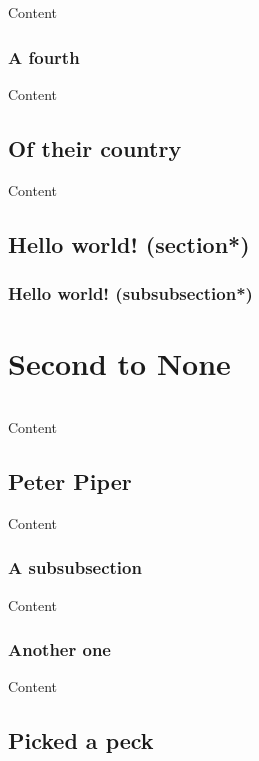 \documentclass{article}
\newcommand{\insMinitoctab}[2][]{%
    \begin{center}#2
    \begin{tabular}{c}\toprule
    \begin{minipage}[c]{0.8\linewidth}
    \insertminitoc[#1]
    \end{minipage}\\ \bottomrule
    \end{tabular}
    \end{center}
}
\begin{document}
Content

\subsubsection{A fourth}

Content

\subsection{Of their country}

Content


\subsection*{Hello world! (section*)}

\subsubsection*{Hello world! (subsubsection*)}


\newpage

\section{Second to None}

\insMinitoctab{\minitocFmt}


Content

\subsection{Peter Piper}

Content

\subsubsection{A subsubsection}

Content

\subsubsection{Another one}

Content

\subsection{Picked a peck}
\end{document}
